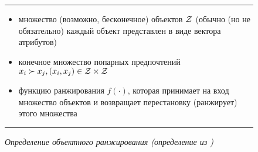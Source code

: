 		\begin{figure}[h]
			\hrule
			\begin{description}[nosep]
				\item[Дано:] \null\leavevmode
				\begin{itemize}[itemsep=0pt,leftmargin=2ex,label=\textbf{---}]
					\item множество (возможно, бесконечное) объектов $\mathcal{Z}$ (обычно (но не обязательно) каждый объект представлен в виде вектора атрибутов)
					\item конечное множество попарных предпочтений $x_i \succ x_j, (x_i, x_j) \in \mathcal{Z} \times \mathcal{Z}$
				\end{itemize}
				\item[Найти:] \null\leavevmode
				\begin{itemize}[itemsep=0pt,leftmargin=2ex,label=\textbf{---}]
					\item функцию ранжирования $f(\cdot)$, которая принимает на вход множество объектов и возвращает перестановку (ранжирует) этого множества
				\end{itemize}
			\end{description} 
			\hrule
			\caption{\it Определение объектного ранжирования (определение из \cite[Fig.~3]{plbook:Introduction:2010})}
			\label{fig:object_ranking}
		\end{figure}
	
	
	